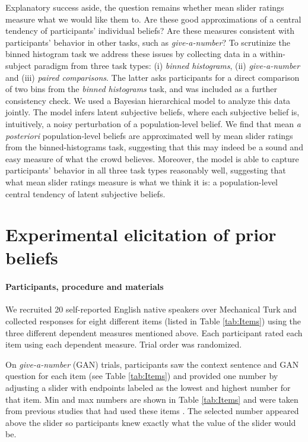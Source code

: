 \documentclass[10pt,letterpaper]{article}
\newcommand{\tableref}[1]{Table \ref{#1}}
\begin{document}
Explanatory success aside, the question remains whether mean slider ratings measure what we
would like them to. Are these good approximations of a central tendency of participants'
individual beliefs? Are these measures consistent with participants' behavior in other tasks,
such as \emph{give-a-number}? To scrutinize the binned histogram task we address these issues
by collecting data in a within-subject paradigm from three task types: (i) \emph{binned
  histograms}, (ii) \emph{give-a-number} and (iii) \emph{paired comparisons}. The latter asks
participants for a direct comparison of two bins from the \emph{binned histograms} task, and
was included as a further consistency check.  We used a Bayesian hierarchical model to analyze
this data jointly.  The model infers latent subjective beliefs, where each subjective
belief is, intuitively, a noisy perturbation of a population-level belief. We find that mean
\emph{a posteriori} population-level beliefs are approximated well by mean slider ratings from
the binned-histograms task, suggesting that this may indeed be a sound and easy measure of what
the crowd believes.  Moreover, the model is able to capture participants' behavior in all three
task types reasonably well, suggesting that what mean slider ratings measure is what we think
it is: a population-level central tendency of latent subjective beliefs.

\section{Experimental elicitation of prior beliefs}

\paragraph{Participants, procedure and materials} We recruited 20 self-reported English native
speakers over Mechanical Turk and collected responses for eight different items (listed in
\tableref{tab:Items}) using the three different dependent measures mentioned above. Each
participant rated each item using each dependent measure. Trial order was randomized.



On \emph{give-a-number} (GAN) trials, participants saw the context sentence and GAN question
for each item (see \tableref{tab:Items}) and provided one number by adjusting a
slider with endpoints labeled as the lowest and highest number for that item. Min and max
numbers are shown in \tableref{tab:Items} and were taken from previous studies that had used
these items
\cite{DegenTessler2015:Wonky-worlds:-L,SchollerFranke2015:Semantic-values,KaoWu2014:Nonliteral-Unde}. The
selected number appeared above the slider so participants knew exactly what the value of the
slider would be.
\end{document}
